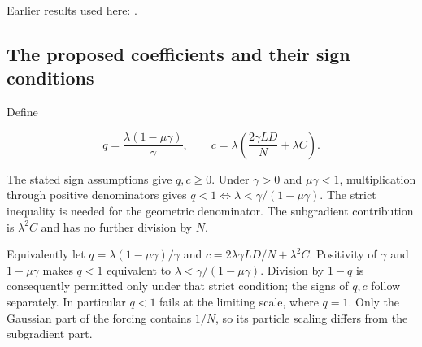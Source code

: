 \documentclass[11pt,a4paper]{report}
\begin{document}
Earlier results used here: \cite[Section~3.15]{LangevinLean2026ULASC}.
\subsection{\texorpdfstring{The proposed coefficients and their sign conditions}{The proposed coefficients and their sign conditions}}
\label{report-step-ProximalLangevin-Recurrence-lean-1}


Define

\[q=\frac{\lambda(1-\mu\gamma)}\gamma,\qquad c=\lambda\left(\frac{2\gamma LD}{N}+\lambda C\right).\]

The stated sign assumptions give \(q,c\ge0\). Under \(\gamma>0\) and \(\mu\gamma<1\), multiplication through positive denominators gives \(q<1\iff\lambda<\gamma/(1-\mu\gamma)\). The strict inequality is needed for the geometric denominator. The subgradient contribution is \(\lambda^2C\) and has no further division by \(N\).



Equivalently let \(q=\lambda(1-\mu\gamma)/\gamma\) and \(c=2\lambda\gamma LD/N+\lambda^2C\). Positivity of \(\gamma\) and \(1-\mu\gamma\) makes \(q<1\) equivalent to \(\lambda<\gamma/(1-\mu\gamma)\). Division by \(1-q\) is consequently permitted only under that strict condition; the signs of \(q,c\) follow separately. In particular \(q<1\) fails at the limiting scale, where \(q=1\). Only the Gaussian part of the forcing contains \(1/N\), so its particle scaling differs from the subgradient part.
\end{document}
